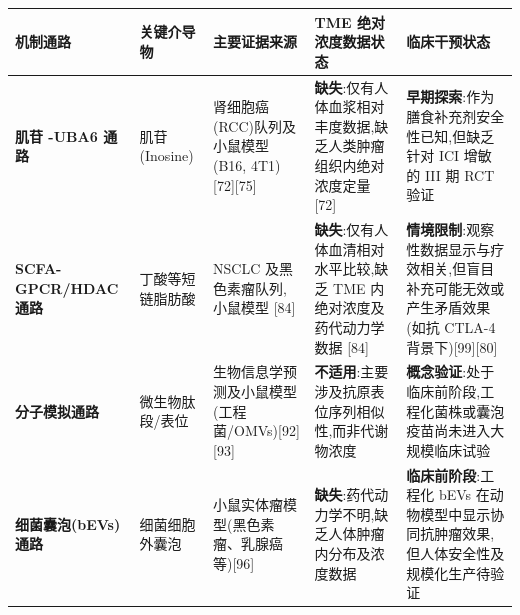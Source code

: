 \documentclass[11pt]{article}
\newcounter{none}
\begin{document}
{\def\LTcaptype{none} %
\begin{longtable}[]{@{}
  >{\raggedright\arraybackslash}p{}
  >{\raggedright\arraybackslash}p{}
  >{\raggedright\arraybackslash}p{}
  >{\raggedright\arraybackslash}p{}
  >{\raggedright\arraybackslash}p{}@{}}
\toprule\noalign{}
\begin{minipage}[b]{\linewidth}\raggedright
机制通路
\end{minipage} & \begin{minipage}[b]{\linewidth}\raggedright
关键介导物
\end{minipage} & \begin{minipage}[b]{\linewidth}\raggedright
主要证据来源
\end{minipage} & \begin{minipage}[b]{\linewidth}\raggedright
TME 绝对浓度数据状态
\end{minipage} & \begin{minipage}[b]{\linewidth}\raggedright
临床干预状态
\end{minipage} \\
\midrule\noalign{}
\endhead
\bottomrule\noalign{}
\endlastfoot
\textbf{肌苷 -UBA6 通路} & 肌苷(Inosine) & 肾细胞癌(RCC)队列及小鼠模型(B16, 4T1){[}72{]}{[}75{]} & \textbf{缺失}:仅有人体血浆相对丰度数据,缺乏人类肿瘤组织内绝对浓度定量 {[}72{]} & \textbf{早期探索}:作为膳食补充剂安全性已知,但缺乏针对 ICI 增敏的 III 期 RCT 验证 \\
\textbf{SCFA-GPCR/HDAC 通路} & 丁酸等短链脂肪酸 & NSCLC 及黑色素瘤队列,小鼠模型 {[}84{]} & \textbf{缺失}:仅有人体血清相对水平比较,缺乏 TME 内绝对浓度及药代动力学数据 {[}84{]} & \textbf{情境限制}:观察性数据显示与疗效相关,但盲目补充可能无效或产生矛盾效果(如抗 CTLA-4 背景下){[}99{]}{[}80{]} \\
\textbf{分子模拟通路} & 微生物肽段/表位 & 生物信息学预测及小鼠模型(工程菌/OMVs){[}92{]}{[}93{]} & \textbf{不适用}:主要涉及抗原表位序列相似性,而非代谢物浓度 & \textbf{概念验证}:处于临床前阶段,工程化菌株或囊泡疫苗尚未进入大规模临床试验 \\
\textbf{细菌囊泡(bEVs)通路} & 细菌细胞外囊泡 & 小鼠实体瘤模型(黑色素瘤、乳腺癌等){[}96{]} & \textbf{缺失}:药代动力学不明,缺乏人体肿瘤内分布及浓度数据 & \textbf{临床前阶段}:工程化 bEVs 在动物模型中显示协同抗肿瘤效果,但人体安全性及规模化生产待验证 \\
\end{longtable}
}
\end{document}
